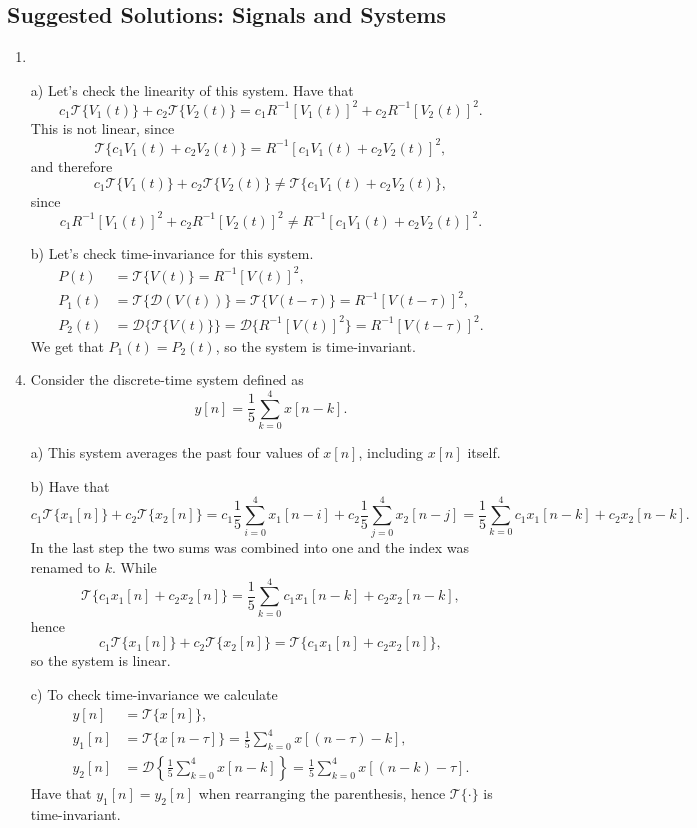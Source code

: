 \newpage
\subsection{Suggested Solutions: Signals and Systems}
\begin{enumerate}
\item
\item[a)] Let's check the linearity of this system. Have that
$$c_{1}\mathcal{T}\{V_{1}(t)\}+c_{2}\mathcal{T}\{V_{2}(t)\}=c_{1}R^{-1}[V_{1}(t)]^{2}+c_{2}R^{-1}[V_{2}(t)]^{2}.$$
This is not linear, since
$$\mathcal{T}\{c_{1}V_{1}(t)+c_{2}V_{2}(t)\}=R^{-1}[c_{1}V_{1}(t)+c_{2}V_{2}(t)]^{2},$$
and therefore
$$c_{1}\mathcal{T}\{V_{1}(t)\}+c_{2}\mathcal{T}\{V_{2}(t)\}\neq\mathcal{T}\{c_{1}V_{1}(t)+c_{2}V_{2}(t)\},$$
since 
$$c_{1}R^{-1}[V_{1}(t)]^{2}+c_{2}R^{-1}[V_{2}(t)]^{2}\neq R^{-1}[c_{1}V_{1}(t)+c_{2}V_{2}(t)]^{2}.$$

\item[b)]
Let's check time-invariance for this system. 
\begin{align*}
    P(t)&=\mathcal{T}\{V(t)\}=R^{-1}[V(t)]^{2}, \\
    P_{1}(t)&=\mathcal{T}\{\mathcal{D}(V(t))\}=\mathcal{T}\{V(t-\tau)\}=R^{-1}[V(t-\tau)]^{2}, \\
    P_{2}(t)&=\mathcal{D}\{\mathcal{T}\{V(t)\}\}=\mathcal{D}\{R^{-1}[V(t)]^{2}\}=R^{-1}[V(t-\tau)]^{2}.
\end{align*}
We get that $P_{1}(t)=P_{2}(t)$, so the system is time-invariant. 

\item
Consider the discrete-time system defined as
$$y[n]=\frac{1}{5}\sum_{k=0}^{4}x[n-k].$$

\item[a)]
This system averages the past four values of $x[n]$, including $x[n]$ itself. 

\item[b)]
Have that
$$c_{1}\mathcal{T}\{x_{1}[n]\}+c_{2}\mathcal{T}\{x_{2}[n]\}=c_{1}\frac{1}{5}\sum_{i=0}^{4}x_{1}[n-i]+c_{2}\frac{1}{5}\sum_{j=0}^{4}x_{2}[n-j]=\frac{1}{5}\sum_{k=0}^{4}c_{1}x_{1}[n-k]+c_{2}x_{2}[n-k].$$
In the last step the two sums was combined into one and the index was renamed to $k$. While 
$$\mathcal{T}\{c_{1}x_{1}[n]+c_{2}x_{2}[n]\}=\frac{1}{5}\sum_{k=0}^{4}c_{1}x_{1}[n-k]+c_{2}x_{2}[n-k],$$
hence 
$$c_{1}\mathcal{T}\{x_{1}[n]\}+c_{2}\mathcal{T}\{x_{2}[n]\}=\mathcal{T}\{c_{1}x_{1}[n]+c_{2}x_{2}[n]\},$$
so the system is linear. 

\item[c)]
To check time-invariance we calculate
\begin{align*}
    y[n]&=\mathcal{T}\{x[n]\}, \\
    y_{1}[n]&=\mathcal{T}\{x[n-\tau]\}=\frac{1}{5}\sum_{k=0}^{4}x[(n-\tau)-k], \\
    y_{2}[n]&=\mathcal{D}\left\{\frac{1}{5}\sum_{k=0}^{4}x[n-k]\right\}=\frac{1}{5}\sum_{k=0}^{4}x[(n-k)-\tau].
\end{align*}
Have that $y_{1}[n]=y_{2}[n]$ when rearranging the parenthesis, hence $\mathcal{T}\{\cdot\}$ is time-invariant. 


\end{enumerate}
